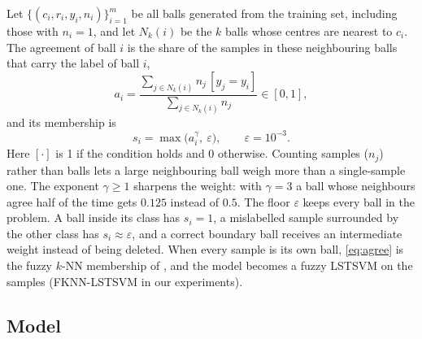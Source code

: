 \documentclass[preprint,12pt]{elsarticle}
\begin{document}
Let $\{(c_i,r_i,y_i,n_i)\}_{i=1}^{m}$ be all balls generated from the training set, including those with $n_i=1$, and let $N_k(i)$ be the $k$ balls whose centres are nearest to $c_i$. The agreement of ball $i$ is the share of the samples in these neighbouring balls that carry the label of ball $i$,
\begin{equation}
a_i=\frac{\sum_{j\in N_k(i)} n_j\,[y_j=y_i]}{\sum_{j\in N_k(i)} n_j}\in[0,1],
\label{eq:agree}
\end{equation}
and its membership is
\begin{equation}
s_i=\max\bigl(a_i^{\gamma},\ \varepsilon\bigr),\qquad \varepsilon=10^{-3}.
\label{eq:membership}
\end{equation}
Here $[\cdot]$ is 1 if the condition holds and 0 otherwise. Counting samples ($n_j$) rather than balls lets a large neighbouring ball weigh more than a single-sample one. The exponent $\gamma\ge 1$ sharpens the weight: with $\gamma=3$ a ball whose neighbours agree half of the time gets $0.125$ instead of $0.5$. The floor $\varepsilon$ keeps every ball in the problem. A ball inside its class has $s_i=1$, a mislabelled sample surrounded by the other class has $s_i\approx\varepsilon$, and a correct boundary ball receives an intermediate weight instead of being deleted. When every sample is its own ball, \eqref{eq:agree} is the fuzzy $k$-NN membership of \cite{keller1985}, and the model becomes a fuzzy LSTSVM on the samples (FKNN-LSTSVM in our experiments).

\subsection{Model}
\end{document}
